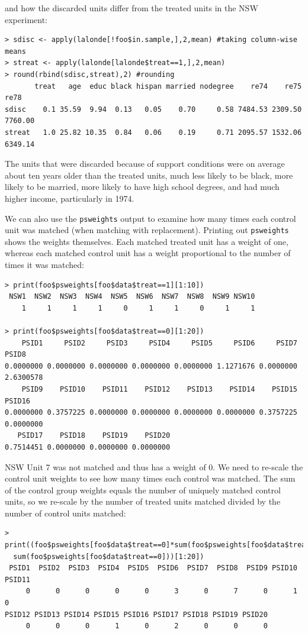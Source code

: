 \documentclass[oneside,letterpaper,titlepage]{article}
\begin{document}
and how the discarded units differ from the treated units in the NSW
experiment:

\begin{verbatim}
> sdisc <- apply(lalonde[!foo$in.sample,],2,mean) #taking column-wise means
> streat <- apply(lalonde[lalonde$treat==1,],2,mean)
> round(rbind(sdisc,streat),2) #rounding
       treat   age  educ black hispan married nodegree    re74    re75    re78
sdisc    0.1 35.59  9.94  0.13   0.05    0.70     0.58 7484.53 2309.50 7760.00
streat   1.0 25.82 10.35  0.84   0.06    0.19     0.71 2095.57 1532.06 6349.14
\end{verbatim}

The units that were discarded because of support conditions were on
average about ten years older than the treated units, much less
likely to be black, more likely to be married, more likely to
have high school degrees, and had much higher income, particularly in
1974.

We can also use the {\tt psweights} output to examine how many times
each control unit was matched (when matching with replacement).
Printing out {\tt psweights} shows the weights themselves. Each
matched treated unit has a weight of one, whereas each matched control
unit has a weight proportional to the number of times it was matched:

\begin{verbatim}
> print(foo$psweights[foo$data$treat==1][1:10])
 NSW1  NSW2  NSW3  NSW4  NSW5  NSW6  NSW7  NSW8  NSW9 NSW10
    1     1     1     1     0     1     1     0     1     1

> print(foo$psweights[foo$data$treat==0][1:20])
    PSID1     PSID2     PSID3     PSID4     PSID5     PSID6     PSID7     PSID8
0.0000000 0.0000000 0.0000000 0.0000000 0.0000000 1.1271676 0.0000000 2.6300578
    PSID9    PSID10    PSID11    PSID12    PSID13    PSID14    PSID15    PSID16
0.0000000 0.3757225 0.0000000 0.0000000 0.0000000 0.0000000 0.3757225 0.0000000
   PSID17    PSID18    PSID19    PSID20
0.7514451 0.0000000 0.0000000 0.0000000
\end{verbatim}

NSW Unit 7 was not matched and thus has a weight of 0.  We need to
re-scale the control unit weights to see how many times each control
was matched.  The sum of the control group weights equals the
number of uniquely matched control units, so we re-scale by the number
of treated units matched divided by the number of control units
matched:

\begin{verbatim}
> print((foo$psweights[foo$data$treat==0]*sum(foo$psweights[foo$data$treat==1])/
  sum(foo$psweights[foo$data$treat==0]))[1:20])
 PSID1  PSID2  PSID3  PSID4  PSID5  PSID6  PSID7  PSID8  PSID9 PSID10 PSID11
     0      0      0      0      0      3      0      7      0      1      0
PSID12 PSID13 PSID14 PSID15 PSID16 PSID17 PSID18 PSID19 PSID20
     0      0      0      1      0      2      0      0      0
\end{verbatim}  %
\end{document}
